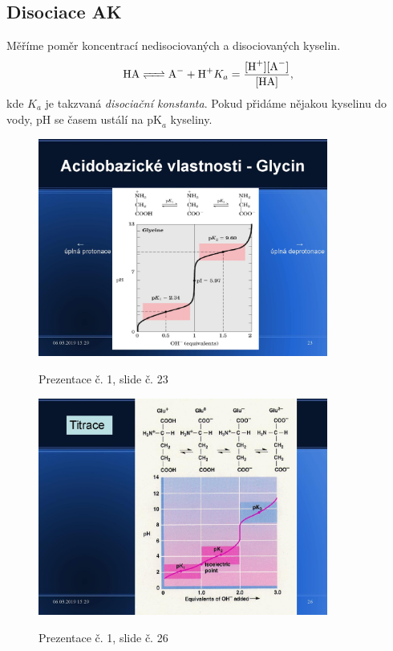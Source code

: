\documentclass[DIV=8]{scrreprt}
\begin{document}
\subsection{Disociace AK} \label{Disociace AK}


Měříme poměr koncentrací nedisociovaných a disociovaných kyselin.
\[\ce{HA <=> A^- + H^+} \\ K_a = \frac{[\ce{H^+}][\ce{A^-}]}{[\ce{HA}]},\]
kde \(K_a\) je takzvaná \emph{disociační konstanta}. Pokud přidáme nějakou kyselinu do vody, pH se časem ustálí na \(\text{pK}_a\) kyseliny.

\begin{figure}
    \caption{Prezentace č. 1, slide č. 23}
    \includegraphics[width=0.85\textwidth]{slides-1/slide-23.jpg}
    \centering
    \label{slides-1-slide-23}
\end{figure}
\begin{figure}
    \caption{Prezentace č. 1, slide č. 26}
    \includegraphics[width=0.85\textwidth]{slides-1/slide-26.jpg}
    \centering
    \label{slides-1-slide-26}
\end{figure}
\end{document}
